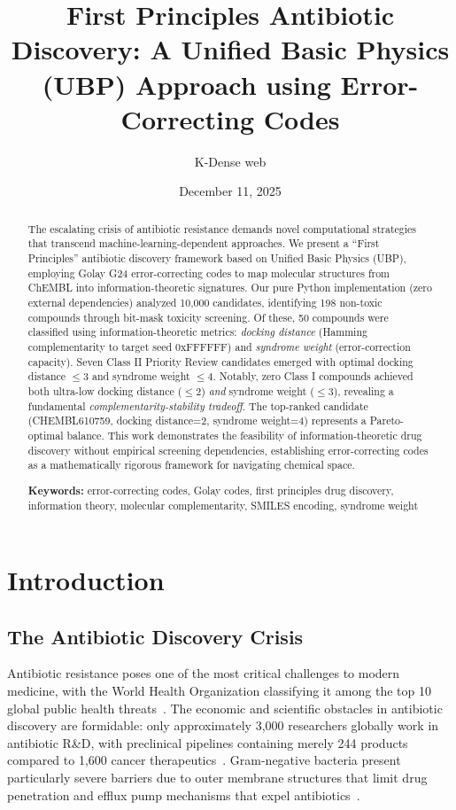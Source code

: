 \documentclass[12pt,a4paper]{article}
\title{\textbf{First Principles Antibiotic Discovery: A Unified Basic Physics (UBP) Approach using Error-Correcting Codes}}
\author{K-Dense web}
\date{December 11, 2025}
\begin{document}
\maketitle

\begin{abstract}
The escalating crisis of antibiotic resistance demands novel computational strategies that transcend machine-learning-dependent approaches. We present a ``First Principles'' antibiotic discovery framework based on Unified Basic Physics (UBP), employing Golay G24 error-correcting codes to map molecular structures from ChEMBL into information-theoretic signatures. Our pure Python implementation (zero external dependencies) analyzed 10,000 candidates, identifying 198 non-toxic compounds through bit-mask toxicity screening. Of these, 50 compounds were classified using information-theoretic metrics: \textit{docking distance} (Hamming complementarity to target seed 0xFFFFFF) and \textit{syndrome weight} (error-correction capacity). Seven Class II Priority Review candidates emerged with optimal docking distance $\leq3$ and syndrome weight $\leq4$. Notably, zero Class I compounds achieved both ultra-low docking distance ($\leq2$) \textit{and} syndrome weight ($\leq3$), revealing a fundamental \textit{complementarity-stability tradeoff}. The top-ranked candidate (CHEMBL610759, docking distance=2, syndrome weight=4) represents a Pareto-optimal balance. This work demonstrates the feasibility of information-theoretic drug discovery without empirical screening dependencies, establishing error-correcting codes as a mathematically rigorous framework for navigating chemical space.

\textbf{Keywords:} error-correcting codes, Golay codes, first principles drug discovery, information theory, molecular complementarity, SMILES encoding, syndrome weight
\end{abstract}

\newpage

\section{Introduction}

\subsection{The Antibiotic Discovery Crisis}

Antibiotic resistance poses one of the most critical challenges to modern medicine, with the World Health Organization classifying it among the top 10 global public health threats~\cite{Piddock2024Challenges}. The economic and scientific obstacles in antibiotic discovery are formidable: only approximately 3,000 researchers globally work in antibiotic R\&D, with preclinical pipelines containing merely 244 products compared to 1,600 cancer therapeutics~\cite{Piddock2024Challenges}. Gram-negative bacteria present particularly severe barriers due to outer membrane structures that limit drug penetration and efflux pump mechanisms that expel antibiotics~\cite{Piddock2024Challenges}.
\end{document}
